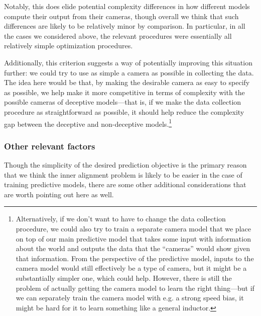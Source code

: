 \documentclass[
  twocolumn,
  natbib,
]{miri-tech-article}
\begin{document}
Notably, this does elide potential complexity differences in how different models compute their output from their cameras, though overall we think that such differences are likely to be relatively minor by comparison. In particular, in all the cases we considered above, the relevant procedures were essentially all relatively simple optimization procedures.

Additionally, this criterion suggests a way of potentially improving this situation further: we could try to use as simple a camera as possible in collecting the data. The idea here would be that, by making the desirable camera as easy to specify as possible, we help make it more competitive in terms of complexity with the possible cameras of deceptive models---that is, if we make the data collection procedure as straightforward as possible, it should help reduce the complexity gap between the deceptive and non-deceptive models.\footnote{Alternatively, if we don't want to have to change the data collection procedure, we could also try to train a separate camera model that we place on top of our main predictive model that takes some input with information about the world and outputs the data that the ``cameras'' would show given that information. From the perspective of the predictive model, inputs to the camera model would still effectively be a type of camera, but it might be a substantially simpler one, which could help. However, there is still the problem of actually getting the camera model to learn the right thing---but if we can separately train the camera model with e.g. a strong speed bias, it might be hard for it to learn something like a general inductor.}


\subsubsection{Other relevant factors}

Though the simplicity of the desired prediction objective is the primary reason that we think the inner alignment problem is likely to be easier in the case of training predictive models, there are some other additional considerations that are worth pointing out here as well.
\end{document}

